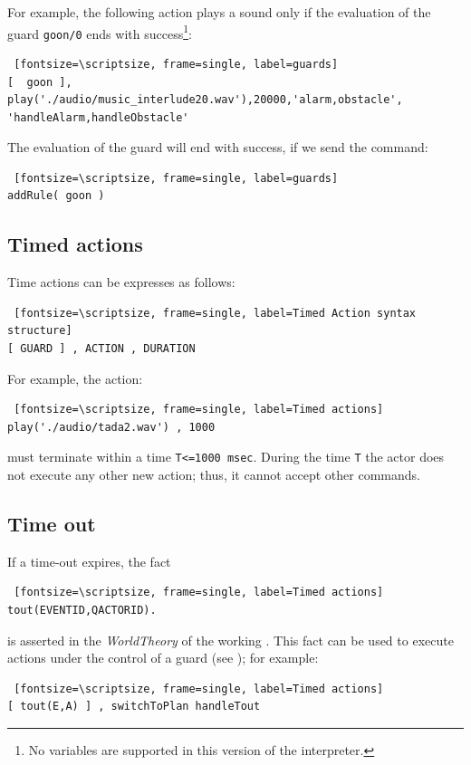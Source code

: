 For example, the following action plays a sound only if the evaluation of the guard \texttt{goon/0} ends with success\footnote{No variables are supported in this version of the interpreter.}:
\begin{Verbatim} [fontsize=\scriptsize, frame=single, label=guards]	
[  goon ], play('./audio/music_interlude20.wav'),20000,'alarm,obstacle', 'handleAlarm,handleObstacle'
\end{Verbatim}

The evaluation of the guard will end with success, if we send the command:
\begin{Verbatim} [fontsize=\scriptsize, frame=single, label=guards]	
addRule( goon )
\end{Verbatim}

\subsection{Timed actions}
Time actions can be expresses as follows:
\begin{Verbatim} [fontsize=\scriptsize, frame=single, label=Timed Action syntax structure]
[ GUARD ] , ACTION , DURATION 
\end{Verbatim}
For example, the action:
\begin{Verbatim} [fontsize=\scriptsize, frame=single, label=Timed actions]		
play('./audio/tada2.wav') , 1000  
\end{Verbatim}
must terminate within a time \texttt{T<=1000 msec}.
During the time \texttt{T} the actor does not execute any other new action; thus, it cannot accept other commands.  

\subsection{Time out}
If a time-out expires, the fact
\begin{Verbatim} [fontsize=\scriptsize, frame=single, label=Timed actions]
tout(EVENTID,QACTORID). 
\end{Verbatim} 

\noindent is asserted in the \textit{WorldTheory} of the working \qa. This fact can be used to execute actions under the control of a guard (see  ); for example:

\begin{Verbatim} [fontsize=\scriptsize, frame=single, label=Timed actions]
[ tout(E,A) ] , switchToPlan handleTout
\end{Verbatim}

